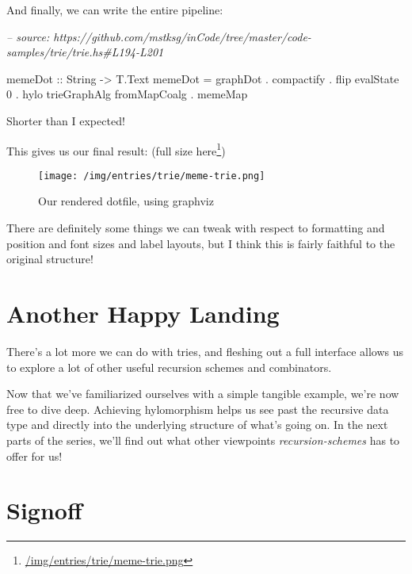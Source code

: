 \documentclass[]{article}
\newenvironment{Shaded}{}{}
\newcommand{\CommentTok}[1]{\textcolor[rgb]{0.38,0.63,0.69}{\textit{#1}}}
\newcommand{\DataTypeTok}[1]{\textcolor[rgb]{0.56,0.13,0.00}{#1}}
\newcommand{\DecValTok}[1]{\textcolor[rgb]{0.25,0.63,0.44}{#1}}
\newcommand{\FunctionTok}[1]{\textcolor[rgb]{0.02,0.16,0.49}{#1}}
\newcommand{\NormalTok}[1]{#1}
\newcommand{\OtherTok}[1]{\textcolor[rgb]{0.00,0.44,0.13}{#1}}
\renewcommand{\href}[2]{#2\footnote{\url{#1}}}
\begin{document}
And finally, we can write the entire pipeline:

\begin{Shaded}
\begin{Highlighting}[]
\CommentTok{-- source: https://github.com/mstksg/inCode/tree/master/code-samples/trie/trie.hs#L194-L201}

\NormalTok{memeDot}
\OtherTok{    ::} \DataTypeTok{String}
    \OtherTok{->} \DataTypeTok{T.Text}
\NormalTok{memeDot }\FunctionTok{=}\NormalTok{ graphDot}
        \FunctionTok{.}\NormalTok{ compactify}
        \FunctionTok{.}\NormalTok{ flip evalState }\DecValTok{0}
        \FunctionTok{.}\NormalTok{ hylo trieGraphAlg fromMapCoalg}
        \FunctionTok{.}\NormalTok{ memeMap}
\end{Highlighting}
\end{Shaded}

Shorter than I expected!

This gives us our final result: (\href{/img/entries/trie/meme-trie.png}{full
size here})

\begin{figure}
\centering
\texttt{[image: /img/entries/trie/meme-trie.png]}
\caption{Our rendered dotfile, using graphviz}
\end{figure}

There are definitely some things we can tweak with respect to formatting and
position and font sizes and label layouts, but I think this is fairly faithful
to the original structure!

\hypertarget{another-happy-landing}{%
\section{Another Happy Landing}\label{another-happy-landing}}

There's a lot more we can do with tries, and fleshing out a full interface
allows us to explore a lot of other useful recursion schemes and combinators.

Now that we've familiarized ourselves with a simple tangible example, we're now
free to dive deep. Achieving hylomorphism helps us see past the recursive data
type and directly into the underlying structure of what's going on. In the next
parts of the series, we'll find out what other viewpoints
\emph{recursion-schemes} has to offer for us!

\hypertarget{signoff}{%
\section{Signoff}\label{signoff}}
\end{document}
